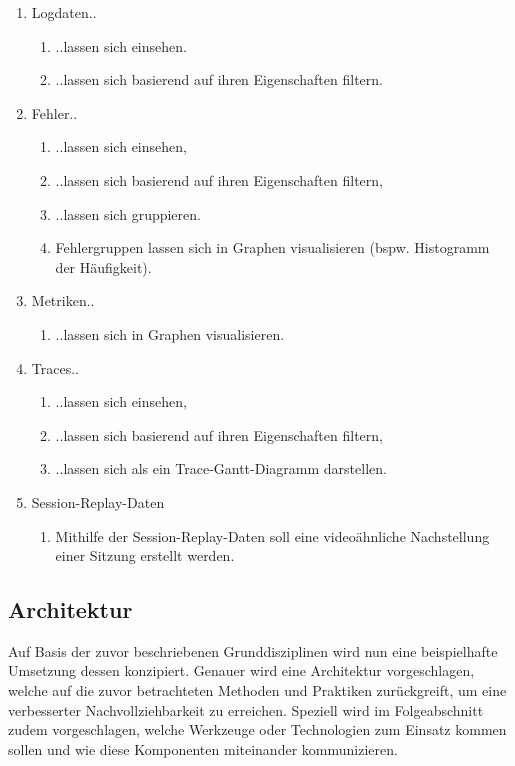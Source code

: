 	\begin{enumerate}
		\item Logdaten..
		\begin{enumerate}
			\item ..lassen sich einsehen.
			\item ..lassen sich basierend auf ihren Eigenschaften filtern.
		\end{enumerate}
		\item Fehler..
		\begin{enumerate}
			\item ..lassen sich einsehen,
			\item ..lassen sich basierend auf ihren Eigenschaften filtern,
			\item ..lassen sich gruppieren.
			\item Fehlergruppen lassen sich in Graphen visualisieren (bspw. Histogramm der Häufigkeit).
		\end{enumerate}
		\item Metriken..
		\begin{enumerate}
			\item ..lassen sich in Graphen visualisieren.
		\end{enumerate}
		\item Traces..
		\begin{enumerate}
			\item ..lassen sich einsehen,
			\item ..lassen sich basierend auf ihren Eigenschaften filtern,
			\item ..lassen sich als ein Trace-Gantt-Diagramm darstellen.
		\end{enumerate}
		\item Session-Replay-Daten
		\begin{enumerate}
			\item Mithilfe der Session-Replay-Daten soll eine videoähnliche Nachstellung einer Sitzung erstellt werden.
		\end{enumerate}
	\end{enumerate}
	
	\subsection{Architektur}
	
	Auf Basis der zuvor beschriebenen Grunddisziplinen wird nun eine beispielhafte Umsetzung dessen konzipiert. Genauer wird eine Architektur vorgeschlagen, welche auf die zuvor betrachteten Methoden und Praktiken zurückgreift, um eine verbesserter Nachvollziehbarkeit zu erreichen. Speziell wird im Folgeabschnitt zudem vorgeschlagen, welche Werkzeuge oder Technologien zum Einsatz kommen sollen und wie diese Komponenten miteinander kommunizieren.
	
